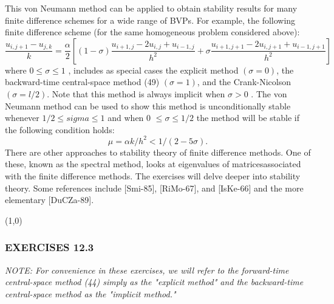 \documentclass[../main.tex]{subfiles}
\begin{document}
This von Neumann method can be applied to obtain stability results for many finite difference schemes for a wide range of BVPs. For example, the following finite difference scheme (for the same homogeneous problem considered above):
\begin{equation}
\dfrac{u_{i,j+1}-u_{j,k}}{k}=\dfrac{\alpha}{2}[(1-\sigma)\dfrac{u_{i+1,j}-2u_{i,j}+u_{i-1,j}}{h^2}+
\sigma\dfrac{u_{i+1,j+1}-2u_{i,j+1}+u_{i-1,j+1}}{h^2}]
\end{equation}
where $0 \leqslant \sigma \leqslant 1$ , includes as special cases the explicit method $(\sigma = 0)$, the backward-time central-space method (49) $( \sigma= 1)$, and the Crank-Nicolson  $( \sigma= l/2)$. Note that this method is always implicit when $\sigma> 0$ . The von Neumann method can be used to show this method is unconditionally stable whenever $1/2\leqslant sigma \leqslant 1$ and when 0 $\leqslant \sigma \leqslant 1/ 2$ the method will be stable if the following condition holds:
\begin{equation}
\mu=\alpha k/h^2 <1/(2-5\sigma).
\end{equation}
There are other approaches to stability theory of finite difference methods. One of these, known as the spectral method, looks at eigenvalues of matricesassociated with the finite difference methods. The exercises will delve deeper into stability theory. Some references include [Smi-85], [RiMo-67], and [IsKe-66] and the more elementary [DuCZa-89].

\line(1,0){\textwidth}
\subsubsection{EXERCISES 12.3 }

\textit{NOTE: For convenience in these exercises, we will refer to the forward-time central-space method (44) simply as the "explicit method" and the backward-time central-space method as the "implicit method."} 
\end{document}

